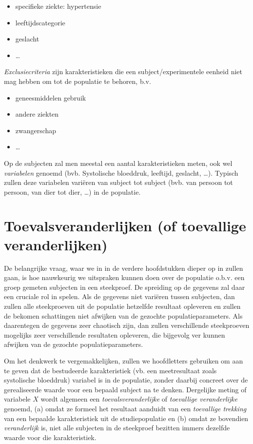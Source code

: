 \documentclass[
  12pt,dutch,coursenotes]{book}
\providecommand{\tightlist}{%
  \setlength{\itemsep}{0pt}\setlength{\parskip}{0pt}}
\begin{document}
\begin{itemize}
\tightlist
\item
  specifieke ziekte: hypertensie
\item
  leeftijdscategorie
\item
  geslacht
\item
  \ldots{}
\end{itemize}

\emph{Exclusiecriteria} zijn karakteristieken die een subject/experimentele eenheid niet mag hebben om tot de populatie te behoren, b.v.

\begin{itemize}
\tightlist
\item
  geneesmiddelen gebruik
\item
  andere ziekten
\item
  zwangerschap
\item
  \ldots{}
\end{itemize}

Op de subjecten zal men meestal een aantal karakteristieken meten, ook wel \emph{variabelen} genoemd (bvb. Systolische bloeddruk, leeftijd, geslacht, \ldots). Typisch zullen deze variabelen variëren van subject tot subject (bvb. van persoon tot persoon, van dier tot dier, \ldots) in de populatie.

\hypertarget{toevalsveranderlijken-of-toevallige-veranderlijken}{%
\section{Toevalsveranderlijken (of toevallige veranderlijken)}\label{toevalsveranderlijken-of-toevallige-veranderlijken}}

De belangrijke vraag, waar we in in de verdere hoofdstukken dieper op in
zullen gaan, is hoe nauwkeurig we uitspraken kunnen doen over de populatie o.b.v. een groep gemeten subjecten in een steekproef.
De spreiding op de gegevens zal daar een cruciale rol in spelen.
Als de gegevens niet variëren tussen subjecten, dan zullen alle steekproeven uit de populatie hetzelfde resultaat opleveren en zullen de bekomen schattingen niet afwijken van de gezochte populatieparameters.
Als daarentegen de gegevens zeer chaotisch zijn, dan zullen verschillende steekproeven mogelijks zeer verschillende resultaten opleveren, die bijgevolg ver kunnen afwijken van de gezochte populatieparameters.

Om het denkwerk te vergemakkelijken, zullen we hoofdletters gebruiken om aan te geven dat
de bestudeerde karakteristiek (vb. een meetresultaat zoals systolische bloeddruk) variabel is in de populatie,
zonder daarbij concreet over de gerealiseerde waarde
voor een bepaald subject na te denken.
Dergelijke meting of variabele \(X\) wordt
algemeen een \emph{toevalsveranderlijke} of \emph{toevallige veranderlijke} genoemd, (a) omdat ze formeel het
resultaat aanduidt van een \emph{toevallige trekking} van een bepaalde
karakteristiek uit de studiepopulatie en (b) omdat ze bovendien \emph{veranderlijk} is,
niet alle subjecten in de steekproef bezitten immers dezelfde waarde
voor die karakteristiek.
\end{document}
